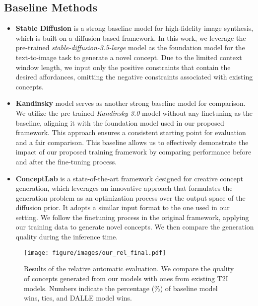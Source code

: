 \subsection{Baseline Methods}
\label{app:baseline}
\begin{itemize}
    \item \textbf{Stable Diffusion} \citep{esser2024scalingrectifiedflowtransformers} is a strong baseline model for high-fidelity image synthesis, which is built on a diffusion-based framework. In this work, we leverage the pre-trained \textit{stable-diffusion-3.5-large} model as the foundation model for the text-to-image task to generate a novel concept. Due to the limited context window length, we input only the positive constraints that contain the desired affordances, omitting the negative constraints associated with existing concepts.
    \item \textbf{Kandinsky} \citep{arkhipkin2023kandinsky, vladimir-etal-2024-kandinsky} model serves as another strong baseline model for comparison. We utilize the pre-trained \textit{Kandinsky 3.0} model without any finetuning as the baseline, aligning it with the foundation model used in our proposed framework. This approach ensures a consistent starting point for evaluation and a fair comparison. This baseline allows us to effectively demonstrate the impact of our proposed training framework by comparing performance before and after the fine-tuning process.
    \item \textbf{ConceptLab} \citep{richardson2024conceptlab} is a state-of-the-art framework designed for creative concept generation, which leverages an innovative approach that formulates the generation problem as an optimization process over the output space of the diffusion prior. It adopts a similar input format to the one used in our setting. We follow the finetuning process in the original framework, applying our training data to generate novel concepts. We then compare the generation quality during the inference time.
\end{itemize}



\begin{figure*}
    \centering
    \texttt{[image: figure/images/our\_rel\_final.pdf]}
    \vspace{-0.2in}
    \caption{Results of the relative automatic evaluation. We compare the quality of concepts generated from our models with ones from existing T2I models. Numbers indicate the percentage (\%) of baseline model wins, ties, and DALLE model wins.}
    \label{fig:rel_eval_ours}
\end{figure*}



